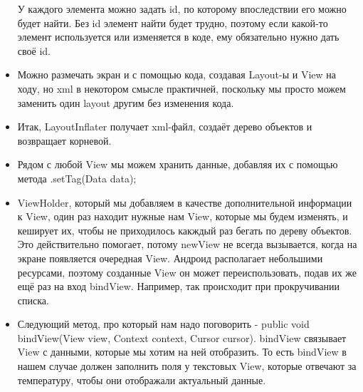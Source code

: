 \documentclass[12 pt]{article}
\begin{document}
\begin{itemize}
        У каждого элемента можно задать id, по которому впоследствии его можно будет найти. Без id элемент найти будет трудно, поэтому если какой-то элемент используется или изменяется в коде, ему обязательно нужно дать своё id.
        \item Можно размечать экран и с помощью кода, создавая Layout-ы и View на ходу, но xml в некотором смысле практичней, поскольку мы просто можем заменить один layout другим без изменения кода.
        \item Итак, LayoutInflater получает xml-файл, создаёт дерево объектов и возвращает корневой.
        \item Рядом с любой View мы можем хранить данные, добавляя их с помощью метода .setTag(Data data);
        \item ViewHolder, который мы добавляем в качестве дополнительной информации к View, один раз находит нужные нам View, которые мы будем изменять, и кеширует их, чтобы не приходилось какждый раз бегать по дереву объектов. Это действительно помогает, потому newView не всегда вызывается, когда на экране появляется очередная View. Андроид располагает небольшими ресурсами, поэтому созданные View он может переиспользовать, подав их же ещё раз на вход bindView. Например, так происходит при прокручивании списка.
        \item Следующий метод, про который нам надо поговорить - public void bindView(View view, Context context, Cursor cursor). bindView связывает View с данными, которые мы хотим на ней отобразить. То есть bindView в нашем случае должен заполнить поля у текстовых View, которые отвечают за температуру, чтобы они отображали актуальный данные.
    \end{itemize}
\end{document}
